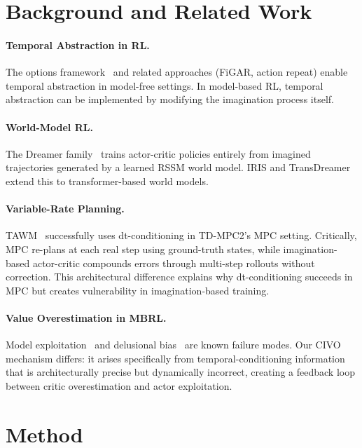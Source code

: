 \documentclass[10pt,twocolumn]{article}
\begin{document}
\section{Background and Related Work}

\paragraph{Temporal Abstraction in RL.}
The options framework~\cite{sutton1999options} and related approaches (FiGAR, action repeat) enable temporal abstraction in model-free settings. In model-based RL, temporal abstraction can be implemented by modifying the imagination process itself.

\paragraph{World-Model RL.}
The Dreamer family~\cite{hafner2020dreamerv1,hafner2021dreamerv2,hafner2023dreamerv3} trains actor-critic policies entirely from imagined trajectories generated by a learned RSSM world model. IRIS and TransDreamer extend this to transformer-based world models.

\paragraph{Variable-Rate Planning.}
TAWM~\cite{nhu2025tawm} successfully uses dt-conditioning in TD-MPC2's MPC setting. Critically, MPC re-plans at each real step using ground-truth states, while imagination-based actor-critic compounds errors through multi-step rollouts without correction. This architectural difference explains why dt-conditioning succeeds in MPC but creates vulnerability in imagination-based training.

\paragraph{Value Overestimation in MBRL.}
Model exploitation~\cite{janner2019mbpo} and delusional bias~\cite{lu2018nondelusional} are known failure modes. Our CIVO mechanism differs: it arises specifically from temporal-conditioning information that is architecturally precise but dynamically incorrect, creating a feedback loop between critic overestimation and actor exploitation.

\section{Method}
\end{document}
